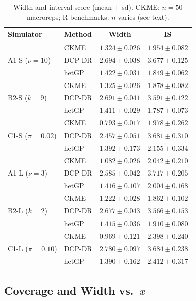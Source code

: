 \documentclass[11pt]{article}
\begin{document}
\begin{table}[h]
\centering
\caption{Width and interval score (mean $\pm$ sd).
         CKME: $n=50$ macroreps; R benchmarks: $n$ varies (see text).}
\label{tab:results}
\small
\setlength{\tabcolsep}{5pt}
\begin{tabular}{llcc}
\toprule
\textbf{Simulator} & \textbf{Method} & \textbf{Width} & \textbf{IS} \\
\midrule
\multirow{3}{*}{A1-S ($\nu=10$)}
 & CKME   & $1.324 \pm 0.026$ & $1.954 \pm 0.082$ \\
 & DCP-DR & $2.694 \pm 0.038$ & $3.677 \pm 0.125$ \\
 & hetGP  & $1.422 \pm 0.031$ & $1.849 \pm 0.062$ \\
\midrule
\multirow{3}{*}{B2-S ($k=9$)}
 & CKME   & $1.325 \pm 0.026$ & $1.878 \pm 0.082$ \\
 & DCP-DR & $2.691 \pm 0.041$ & $3.591 \pm 0.122$ \\
 & hetGP  & $1.411 \pm 0.029$ & $1.787 \pm 0.073$ \\
\midrule
\multirow{3}{*}{C1-S ($\pi=0.02$)}
 & CKME   & $0.793 \pm 0.017$ & $1.978 \pm 0.262$ \\
 & DCP-DR & $2.457 \pm 0.051$ & $3.681 \pm 0.310$ \\
 & hetGP  & $1.392 \pm 0.173$ & $2.155 \pm 0.334$ \\
\midrule
\multirow{3}{*}{A1-L ($\nu=3$)}
 & CKME   & $1.082 \pm 0.026$ & $2.042 \pm 0.210$ \\
 & DCP-DR & $2.585 \pm 0.042$ & $3.717 \pm 0.205$ \\
 & hetGP  & $1.416 \pm 0.107$ & $2.004 \pm 0.168$ \\
\midrule
\multirow{3}{*}{B2-L ($k=2$)}
 & CKME   & $1.222 \pm 0.028$ & $1.862 \pm 0.102$ \\
 & DCP-DR & $2.677 \pm 0.043$ & $3.566 \pm 0.153$ \\
 & hetGP  & $1.415 \pm 0.036$ & $1.910 \pm 0.080$ \\
\midrule
\multirow{3}{*}{C1-L ($\pi=0.10$)}
 & CKME   & $0.969 \pm 0.121$ & $2.398 \pm 0.240$ \\
 & DCP-DR & $2.780 \pm 0.097$ & $3.684 \pm 0.238$ \\
 & hetGP  & $1.390 \pm 0.162$ & $2.412 \pm 0.317$ \\
\bottomrule
\end{tabular}
\end{table}

\subsection{Coverage and Width vs.\ $x$}
\end{document}
